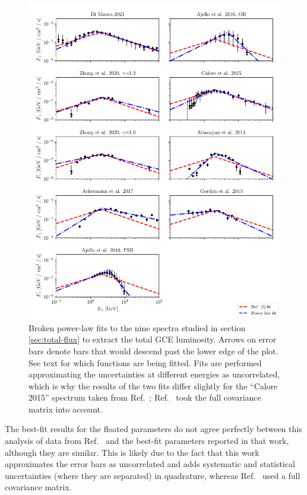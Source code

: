 \documentclass[letter,11pt]{article}
\begin{document}
\begin{figure}
    \centering
    \includegraphics[width=\textwidth]{figs/all-fits.pdf}
    \caption{Broken power-law fits to the nine spectra studied in section \ref{sec:total-flux} to extract the total GCE luminosity. Arrows on error bars denote bars that would descend past the lower edge of the plot. See text for which functions are being fitted. Fits are performed approximating the uncertainties at different energies as uncorrelated, which is why the results of the two fits differ slightly for the ``Calore 2015'' spectrum taken from Ref.~\cite{Calore:2014xka}; Ref.~\cite{Calore:2014xka} took the full covariance matrix into account.}
    \label{fig:spectrum-fits}
\end{figure}

The best-fit results for the floated parameters do not agree perfectly between this analysis of data from Ref.~\cite{Calore:2014xka} and the best-fit parameters reported in that work, although they are similar.  This is likely due to the fact that this work approximates the error bars as uncorrelated and adds systematic and statistical uncertainties (where they are separated) in quadrature, whereas Ref.~\cite{Calore:2014xka} used a full covariance matrix.
\end{document}
